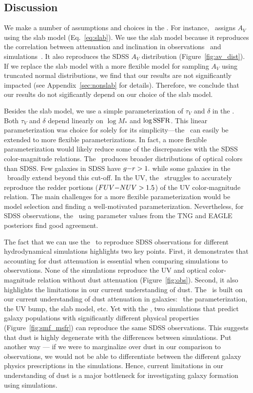 \subsection{Discussion}  
We make a number of assumptions and choices in the \eda. For instance, 
\eda~assigns $A_V$ using the slab model (Eq.~\ref{eq:slab}). We use the slab
model because it reproduces the correlation between attenuation and inclination 
in observations~\citep{conroy2010b, wild2011, battisti2017, salim2020} and
simulations~\citep[\eg][]{chevallard2013, narayanan2018, trayford2020}.
It also reproduces the SDSS $A_V$ distribution (Figure~\ref{fig:av_dist}). If
we replace the slab model with a more flexible model for sampling $A_V$ using
truncated normal distributions, we find that our results are not significantly
impacted (see Appendix~\ref{sec:nonslab} for details). Therefore, we conclude
that our results do not sigificantly depend on our choice of the slab model. 

Besides the slab model, we use a simple parameterization of $\tau_V$ and
$\delta$ in the \eda. Both $\tau_V$ and $\delta$ depend linearly on $\log M_*$ 
and $\log {\rm SSFR}$. This linear parameterization was choice for solely for
its simplicity---the \eda~can easily be extended to more flexible
parameterizations. In fact, a more flexible parameterization would likely reduce 
some of the discrepancies with the SDSS color-magnitude relations. The
\eda~produces broader distributions of optical colors than SDSS. Few galaxies
in SDSS have $g{-}r > 1.$ while some galaxies in the \eda~broadly extend beyond
this cut-off. In the UV, the \eda~struggles to accurately reproduce the redder
portions ($FUV{-}NUV > 1.5$) of the UV color-magnitude relation. The main
challenges for a more flexible parameterization would be model selection and
finding a well-motivated parameterization. Nevertheless, for SDSS 
observations, the \eda~using parameter values from the TNG and EAGLE
posteriors find good agreement.

The fact that we can use the \eda~to reproduce SDSS observations for different
hydrodynamical simulations highlights two key points. First, it demonstrates 
that accounting for dust attenuation is essential when comparing simulations to
observations. None of the simulations reproduce the UV and optical
color-magnitude relation without dust attenuation (Figure~\ref{fig:obs}). 
Second, it also highlights the limitations in our current understanding of dust. 
The \eda~is built on our current understanding of dust attenuation in galaxies:
\eg~the \citealt{noll2009} parameterization, the UV bump, the slab model, etc.
Yet with the \eda, two simulations that predict galaxy populations with
significantly different physical properties (Figure~\ref{fig:smf_msfr}) can
reproduce the same SDSS observations. This suggests that dust is highly
degenerate with the differences between simulations. Put another way --- if we 
were to marginalize over dust in our comparison to observations, we would not
be able to differentiate between the different galaxy physics prescriptions in
the simulations. Hence, current limitations in our understanding of dust is 
a major bottleneck for investigating galaxy formation using simulations.


